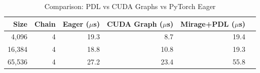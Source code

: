 \begin{table}[t]
\centering
\caption{Comparison: PDL vs CUDA Graphs vs PyTorch Eager}
\label{tab:baseline_comparison}
\begin{tabular}{rrrrrr}
\toprule
Size & Chain & Eager ($\mu$s) & CUDA Graph ($\mu$s) & Mirage+PDL ($\mu$s) \\
\midrule
4,096 & 4 & 19.3 & 8.7 & 19.4 \\
16,384 & 4 & 18.8 & 10.8 & 19.3 \\
65,536 & 4 & 27.2 & 23.4 & 55.8 \\
\bottomrule
\end{tabular}
\end{table}